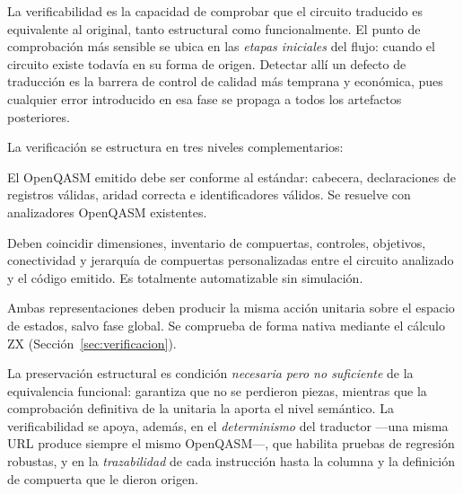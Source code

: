 \documentclass[11pt,a4paper]{article}
\begin{document}
La verificabilidad es la capacidad de comprobar que el circuito traducido es equivalente al
original, tanto estructural como funcionalmente. El punto de comprobación más sensible se
ubica en las \emph{etapas iniciales} del flujo: cuando el circuito existe todavía en su
forma de origen. Detectar allí un defecto de traducción es la barrera de control de calidad
más temprana y económica, pues cualquier error introducido en esa fase se propaga a todos
los artefactos posteriores.

La verificación se estructura en tres niveles complementarios:

\begin{description}[leftmargin=1.6em]
  \item[Nivel sintáctico.] El OpenQASM emitido debe ser conforme al estándar: cabecera,
        declaraciones de registros válidas, aridad correcta e identificadores válidos. Se
        resuelve con analizadores OpenQASM existentes.
  \item[Nivel estructural.] Deben coincidir dimensiones, inventario de compuertas,
        controles, objetivos, conectividad y jerarquía de compuertas personalizadas entre el
        circuito analizado y el código emitido. Es totalmente automatizable sin simulación.
  \item[Nivel semántico.] Ambas representaciones deben producir la misma acción unitaria
        sobre el espacio de estados, salvo fase global. Se comprueba de forma nativa mediante
        el cálculo ZX (Sección~\ref{sec:verificacion}).
\end{description}

La preservación estructural es condición \emph{necesaria pero no suficiente} de la
equivalencia funcional: garantiza que no se perdieron piezas, mientras que la comprobación
definitiva de la unitaria la aporta el nivel semántico. La verificabilidad se apoya, además,
en el \emph{determinismo} del traductor ---una misma URL produce siempre el mismo
OpenQASM---, que habilita pruebas de regresión robustas, y en la \emph{trazabilidad} de cada
instrucción hasta la columna y la definición de compuerta que le dieron origen.
\end{document}
